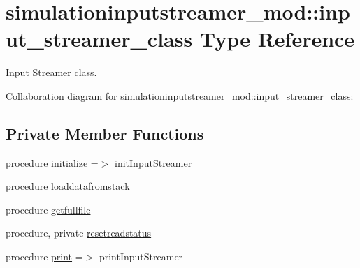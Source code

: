 \hypertarget{structsimulationinputstreamer__mod_1_1input__streamer__class}{}\section{simulationinputstreamer\+\_\+mod\+:\+:input\+\_\+streamer\+\_\+class Type Reference}
\label{structsimulationinputstreamer__mod_1_1input__streamer__class}


Input Streamer class.  




Collaboration diagram for simulationinputstreamer\+\_\+mod\+:\+:input\+\_\+streamer\+\_\+class\+:
\subsection*{Private Member Functions}
\begin{DoxyCompactItemize}
\item 
procedure \mbox{\hyperlink{structsimulationinputstreamer__mod_1_1input__streamer__class_a52470b6d47f3ce270f9fdc14ccfa25d5}{initialize}} =$>$ init\+Input\+Streamer
\item 
procedure \mbox{\hyperlink{structsimulationinputstreamer__mod_1_1input__streamer__class_a76d4d67d354652f319fd93a340049cfb}{loaddatafromstack}}
\item 
procedure \mbox{\hyperlink{structsimulationinputstreamer__mod_1_1input__streamer__class_a8fb8a5031b4f6aaf7adb725089f9fd2d}{getfullfile}}
\item 
procedure, private \mbox{\hyperlink{structsimulationinputstreamer__mod_1_1input__streamer__class_aa1582178235a956bb2aae6c98d25fa7a}{resetreadstatus}}
\item 
procedure \mbox{\hyperlink{structsimulationinputstreamer__mod_1_1input__streamer__class_af3faf35d98fba46362d3771ab1dac9ba}{print}} =$>$ print\+Input\+Streamer
\end{DoxyCompactItemize}
